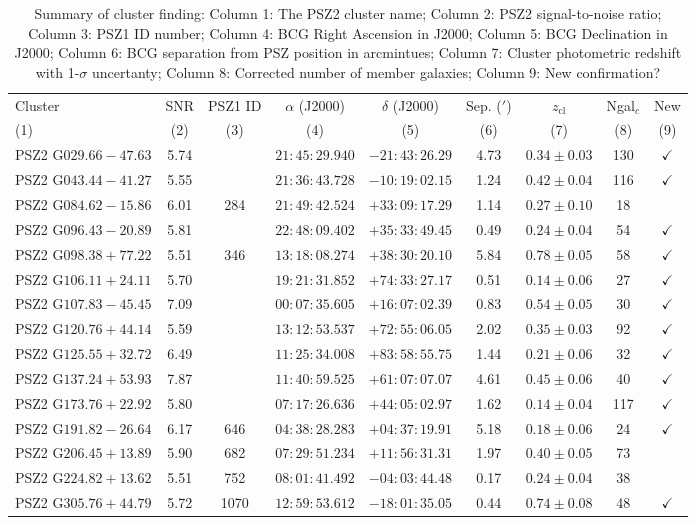 \documentclass[apj, revtex4-1]{emulateapj}
\begin{document}
\begin{table}
	\caption[Summary of Cluster Confirmation]{Summary of cluster finding: Column 1: The PSZ2 cluster name; Column 2: PSZ2 signal-to-noise ratio; Column 3: PSZ1 ID number; Column 4: BCG Right Ascension in J2000; Column 5: BCG Declination in J2000; Column 6: BCG separation from PSZ position in arcmintues; Column 7: Cluster photometric redshift with 1-$\sigma$ uncertanty; Column 8: Corrected number of member galaxies; Column 9: New confirmation? }
	\centering
	\begin{tabular}{lcccccccc}
	\hline
	Cluster & SNR & PSZ1 ID & $\alpha$ (J2000) & $\delta$ (J2000) & Sep. ($'$) & $z_\mathrm{cl}$ & Ngal$_c$ & New\\
	(1) & (2) & (3) & (4) & (5) & (6) & (7) & (8) & (9) \\
	\hline
	 PSZ2 G$029.66-47.63$ & 5.74 & \nd & $21:45:29.940$ & $-21:43:26.29$ & 4.73 & $0.34 \pm 0.03$ & 130 & $\checkmark$ \\
	 PSZ2 G$043.44-41.27$ & 5.55 & \nd & $21:36:43.728$ & $-10:19:02.15$ & 1.24 & $0.42 \pm 0.04$ & 116 & $\checkmark$ \\
	 PSZ2 G$084.62-15.86$ & 6.01 & 284 & $21:49:42.524$ & $+33:09:17.29$ & 1.14 & $0.27 \pm 0.10$ & 18 & \\
	 PSZ2 G$096.43-20.89$ & 5.81 & \nd & $22:48:09.402$ & $+35:33:49.45$ & 0.49 & $0.24 \pm 0.04$ & 54 & $\checkmark$ \\
	 PSZ2 G$098.38+77.22$ & 5.51 & 346 & $13:18:08.274$ & $+38:30:20.10$ & 5.84 & $0.78 \pm 0.05$ & 58 & $\checkmark$ \\
	 PSZ2 G$106.11+24.11$ & 5.70 & \nd & $19:21:31.852$ & $+74:33:27.17$ & 0.51 & $0.14 \pm 0.06$ & 27 & $\checkmark$ \\
	 PSZ2 G$107.83-45.45$ & 7.09 & \nd & $00:07:35.605$ & $+16:07:02.39$ & 0.83 & $0.54 \pm 0.05$ & 30 & $\checkmark$ \\
	 PSZ2 G$120.76+44.14$ & 5.59 & \nd & $13:12:53.537$ & $+72:55:06.05$ & 2.02 & $0.35 \pm 0.03$ & 92 & $\checkmark$ \\
	 PSZ2 G$125.55+32.72$ & 6.49 & \nd & $11:25:34.008$ & $+83:58:55.75$ & 1.44 & $0.21 \pm 0.06$ & 32 & $\checkmark$ \\
	 PSZ2 G$137.24+53.93$ & 7.87 & \nd & $11:40:59.525$ & $+61:07:07.07$ & 4.61 & $0.45 \pm 0.06$ & 40 & $\checkmark$ \\
	 PSZ2 G$173.76+22.92$ & 5.80 & \nd & $07:17:26.636$ & $+44:05:02.97$ & 1.62 & $0.14 \pm 0.04$ & 117 & $\checkmark$ \\
	 PSZ2 G$191.82-26.64$ & 6.17 & 646 & $04:38:28.283$ & $+04:37:19.91$ & 5.18 & $0.18 \pm 0.06$ & 24 & $\checkmark$ \\
	 PSZ2 G$206.45+13.89$ & 5.90 & 682 & $07:29:51.234$ & $+11:56:31.31$ & 1.97 & $0.40 \pm 0.05$ & 73 & \\
	 PSZ2 G$224.82+13.62$ & 5.51 & 752 & $08:01:41.492$ & $-04:03:44.48$ & 0.17 & $0.24 \pm 0.04$ & 38 & \\
	 PSZ2 G$305.76+44.79$ & 5.72 & 1070 & $12:59:53.612$ & $-18:01:35.05$ & 0.44 & $0.74 \pm 0.08$ & 48 & $\checkmark$ \\
	\hline
	\end{tabular}
\label{tbl:results}
\end{table}
\end{document}
